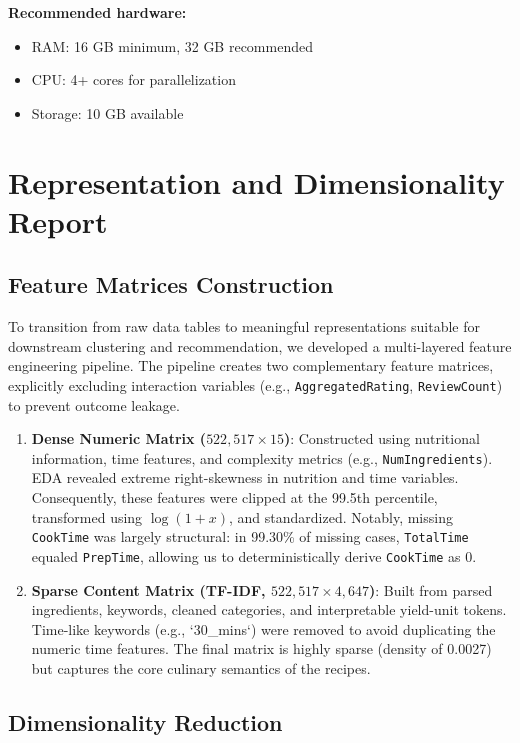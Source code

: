 \documentclass[11pt,a4paper]{article}
\begin{document}
\textbf{Recommended hardware:}
\begin{itemize}
    \item RAM: 16 GB minimum, 32 GB recommended
    \item CPU: 4+ cores for parallelization
    \item Storage: 10 GB available
\end{itemize}

\section{Representation and Dimensionality Report}

\subsection{Feature Matrices Construction}

To transition from raw data tables to meaningful representations suitable for downstream clustering and recommendation, we developed a multi-layered feature engineering pipeline. The pipeline creates two complementary feature matrices, explicitly excluding interaction variables (e.g., \texttt{AggregatedRating}, \texttt{ReviewCount}) to prevent outcome leakage.

\begin{enumerate}
    \item \textbf{Dense Numeric Matrix ($522,517 \times 15$)}: 
    Constructed using nutritional information, time features, and complexity metrics (e.g., \texttt{NumIngredients}). EDA revealed extreme right-skewness in nutrition and time variables. Consequently, these features were clipped at the 99.5th percentile, transformed using $\log(1+x)$, and standardized. Notably, missing \texttt{CookTime} was largely structural: in 99.30\% of missing cases, \texttt{TotalTime} equaled \texttt{PrepTime}, allowing us to deterministically derive \texttt{CookTime} as 0.
    
    \item \textbf{Sparse Content Matrix (TF-IDF, $522,517 \times 4,647$)}: 
    Built from parsed ingredients, keywords, cleaned categories, and interpretable yield-unit tokens. Time-like keywords (e.g., `30\_mins`) were removed to avoid duplicating the numeric time features. The final matrix is highly sparse (density of 0.0027) but captures the core culinary semantics of the recipes.
\end{enumerate}

\subsection{Dimensionality Reduction}
\end{document}
